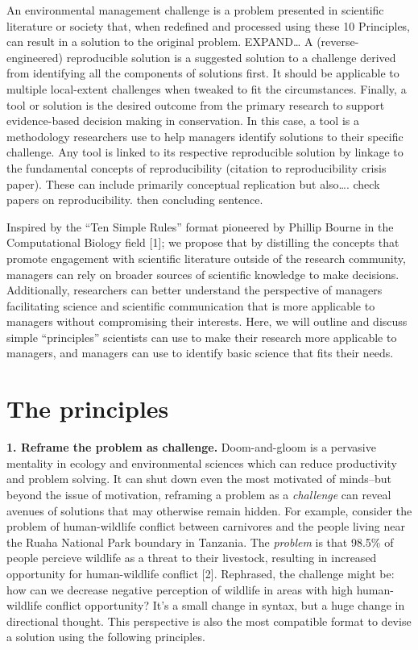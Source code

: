 \documentclass[10pt,letterpaper]{article}
\begin{document}
An environmental management challenge is a problem presented in
scientific literature or society that, when redefined and processed
using these 10 Principles, can result in a solution to the original
problem. EXPAND\ldots{} A (reverse-engineered) reproducible solution is
a suggested solution to a challenge derived from identifying all the
components of solutions first. It should be applicable to multiple
local-extent challenges when tweaked to fit the circumstances. Finally,
a tool or solution is the desired outcome from the primary research to
support evidence-based decision making in conservation. In this case, a
tool is a methodology researchers use to help managers identify
solutions to their specific challenge. Any tool is linked to its
respective reproducible solution by linkage to the fundamental concepts
of reproducibility (citation to reproducibility crisis paper). These can
include primarily conceptual replication but also\ldots{}. check papers
on reproducibility. then concluding sentence.

Inspired by the ``Ten Simple Rules'' format pioneered by Phillip Bourne
in the Computational Biology field {[}1{]}; we propose that by
distilling the concepts that promote engagement with scientific
literature outside of the research community, managers can rely on
broader sources of scientific knowledge to make decisions. Additionally,
researchers can better understand the perspective of managers
facilitating science and scientific communication that is more
applicable to managers without compromising their interests. Here, we
will outline and discuss simple ``principles'' scientists can use to
make their research more applicable to managers, and managers can use to
identify basic science that fits their needs.

\section{The principles}\label{the-principles}

\textbf{1. Reframe the problem as challenge.} Doom-and-gloom is a
pervasive mentality in ecology and environmental sciences which can
reduce productivity and problem solving. It can shut down even the most
motivated of minds--but beyond the issue of motivation, reframing a
problem as a \emph{challenge} can reveal avenues of solutions that may
otherwise remain hidden. For example, consider the problem of
human-wildlife conflict between carnivores and the people living near
the Ruaha National Park boundary in Tanzania. The \emph{problem} is that
98.5\% of people percieve wildlife as a threat to their livestock,
resulting in increased opportunity for human-wildlife conflict {[}2{]}.
Rephrased, the challenge might be: how can we decrease negative
perception of wildlife in areas with high human-wildlife conflict
opportunity? It's a small change in syntax, but a huge change in
directional thought. This perspective is also the most compatible format
to devise a solution using the following principles.
\end{document}
